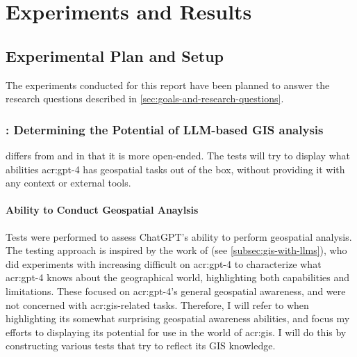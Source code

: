 \chapter{Experiments and Results}
\label{cha:experiments}

\section{Experimental Plan and Setup}
\label{sec:experimental-plan-and-setup}

\begin{comment}
Trying and failing is a major part of research. However, to have a chance of success you need a plan driving the experimental research, just as you need a plan for your literature search. Further, plans are made to be revised, and this revision ensures that any further decisions made are in line with the work already completed.

The plan should include what experiments or series of experiments are planned and what questions the individual or set of experiments aim to answer. Such questions should be connected to your research questions, so that in the evaluation of your results you can discuss the results wrt to the research questions.
\end{comment}

The experiments conducted for this report have been planned to answer the research questions described in \autoref{sec:goals-and-research-questions}.

\subsection[RQ1: Determining the Potential of LLM-based GIS analysis]{: Determining the Potential of LLM-based GIS analysis}

 differs from  and  in that it is more open-ended. The tests will try to display what abilities \acrshort{acr:gpt}-4 has geospatial tasks out of the box, without providing it with any context or external tools.

\subsubsection{Ability to Conduct Geospatial Anaylsis}

Tests were performed to assess ChatGPT's ability to perform geospatial analysis. The testing approach is inspired by the work of \cite{robertsGPT4GEOHowLanguage2023} (see \autoref{subsec:gis-with-llms}), who did experiments with increasing difficult on \acrshort{acr:gpt}-4 to characterize what \acrshort{acr:gpt}-4 knows about the geographical world, highlighting both capabilities and limitations. These focused on \acrshort{acr:gpt}-4's general geospatial awareness, and were not concerned with \acrshort{acr:gis}-related tasks. Therefore, I will refer to \cite{robertsGPT4GEOHowLanguage2023} when highlighting its somewhat surprising geospatial awareness abilities, and focus my efforts to displaying its potential for use in the world of \acrshort{acr:gis}. I will do this by constructing various tests that try to reflect its GIS knowledge.

